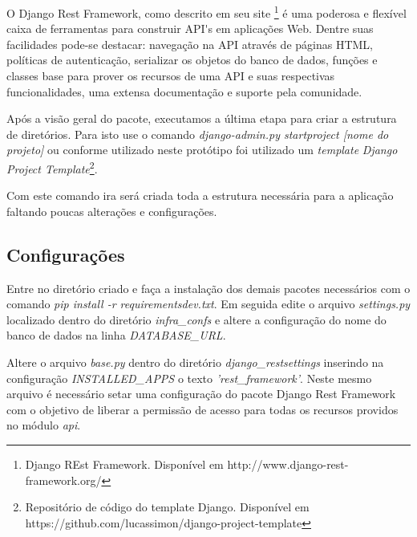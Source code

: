   O Django Rest Framework, como descrito em seu site \footnote[10]{Django REst Framework. Disponível em http://www.django-rest-framework.org/} é uma poderosa
  e flexível caixa de ferramentas para construir API\'{}s em aplicações Web. Dentre suas facilidades pode-se destacar: navegação na API através
  de páginas HTML, políticas de autenticação, serializar os objetos do banco de dados, funções e classes base para prover os recursos
  de uma API e suas respectivas funcionalidades, uma extensa documentação e suporte pela comunidade.
  
  Após a visão geral do pacote, executamos a última etapa para criar a estrutura de diretórios. Para isto use o comando
  \textit{django-admin.py startproject [nome do projeto] } ou conforme utilizado neste protótipo foi utilizado um \textit{template}
  \textit{Django Project Template}\footnote[11]{Repositório de código do template Django. Disponível em https://github.com/lucassimon/django-project-template}.
  
  Com este comando ira será criada toda a estrutura necessária para a aplicação faltando poucas alterações e configurações.
  
\subsection{Configurações}

  Entre no diretório criado e faça a instalação dos demais pacotes necessários com o comando \textit{pip install -r requirements\/dev.txt}.
  Em seguida edite o arquivo \textit{settings.py} localizado dentro do diretório \textit{infra\_confs\/} e altere a configuração
  do nome do banco de dados na linha \textit{DATABASE\_URL}.
  
  Altere o arquivo \textit{base.py} dentro do diretório \textit{django\_rest\/settings\/} inserindo na configuração \textit{INSTALLED\_APPS}
  o texto \textit{'rest\_framework'}. Neste mesmo arquivo é necessário setar uma configuração do pacote Django Rest Framework
  com o objetivo de liberar a permissão de acesso para todas os recursos providos no módulo \textit{api}.
  
